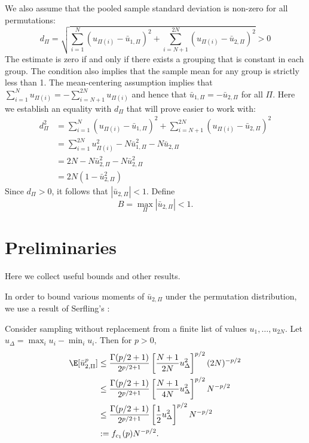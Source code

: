 We also assume that the pooled sample standard deviation is non-zero for all permutations:
\begin{equation}
  \label{A:non-zero-std-dev}
  d_\Pi = \sqrt{\sum_{i=1}^N(u_{\Pi(i)} - \bar{u}_{1,\Pi})^2 + \sum_{i=N+1}^{2N}(u_{\Pi(i)} -
    \bar{u}_{2,\Pi})^2} > 0
\end{equation}
The estimate is zero if and only if there exists a grouping that is constant in each group.  The
condition also implies that the sample mean for any group is strictly less than 1.  The
mean-centering assumption implies that $\sum_{i=1}^{N} u_{\Pi(i)} = - \sum_{i=N+1}^{2N} u_{\Pi(i)}$
and hence that $\bar{u}_{1,\Pi} = -\bar{u}_{2,\Pi}$ for all $\Pi$.  Here we establish an equality
with $d_{\Pi}$ that will prove easier to work with:
\begin{align*}
  d_\Pi^2 &=  \sum_{i=1}^N(u_{\Pi(i)} - \bar{u}_{1,\Pi})^2 + \sum_{i=N+1}^{2N}(u_{\Pi(i)} -
    \bar{u}_{2,\Pi})^2 \\
  &= \sum_{i=1}^{2N} u_{\Pi(i)}^2 - N \bar{u}_{1,\Pi}^2 - N \bar{u}_{2,\Pi} \\
  &= 2N - N \bar{u}_{2,\Pi}^2 - N \bar{u}_{2,\Pi}^2 \\
  &= 2N(1 - \bar{u}_{2,\Pi}^2)
\end{align*}
Since $d_\Pi > 0$, it follows that $|\bar{u}_{2,\Pi}| < 1$.  Define
\begin{equation}
  \label{A:B}
  B = \max_\Pi |\bar{u}_{2,\Pi}| < 1.
\end{equation}

\section{Preliminaries}
Here we collect useful bounds and other results.  

In order to bound various moments of $\bar{u}_{2,\Pi}$ under the permutation distribution, we use a
result of Serfling's
\cite{serfling1974probability}:
\begin{proposition}
  Consider sampling without replacement from a finite list of values
  $u_1, \ldots, u_{2N}$.  Let $u_{\Delta} = \max_i u_{i} - \min_i u_{i}$. Then for $p > 0$,
  \begin{align}
    \E [\bar{u}_{2,\Pi}^p] 
    &\leq \frac{\Gamma(p/2 + 1)}{2^{p/2 + 1}}
    \left [ \frac{N+1}{2N}u_{\Delta}^2 \right ]^{p/2}
    (2N)^{-p/2} \nonumber \\
    &\leq \frac{\Gamma(p/2 + 1)}{2^{p/2 + 1}}
    \left [ \frac{N+1}{4N}u_{\Delta}^2 \right ]^{p/2}
    N^{-p/2} \nonumber \\
    &\leq \frac{\Gamma(p/2 + 1)}{2^{p/2 + 1}}
    \left [ \frac{1}{2}u_{\Delta}^2 \right ]^{p/2}
    N^{-p/2} \nonumber \\
    &:= f_{c_1}(p)N^{-p/2} \label{def:serfling}.
  \end{align}
\end{proposition}

